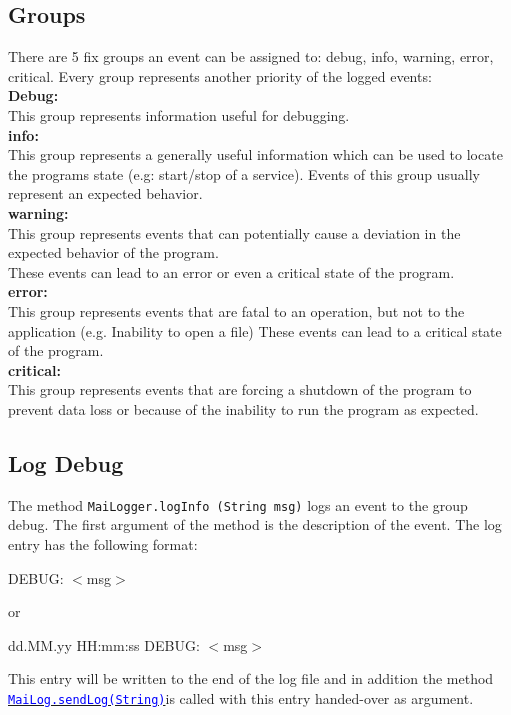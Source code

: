 \documentclass{article}
\newcommand{\refh}[2]{\hyperref[#1] {\textcolor{blue}{#2}}}
\newcommand{\sendLog}{\refh{setup_interface}{\lstinline|MaiLog.sendLog(String)|}}
\begin{document}
    \subsection{Groups}
    \label{logging_groups}
    There are 5 fix groups an event can be assigned to: debug, info, warning, error, critical.
    Every group represents another priority of the logged events: \\
    
    \textbf{Debug:} \\
    This group represents information useful for debugging. \\

    \textbf{info:} \\
    This group represents a generally useful information which can be used to locate the programs state (e.g: start/stop of a service).
    Events of this group usually represent an expected behavior. \\

    \textbf{warning:} \\
    This group represents events that can potentially cause a deviation in the expected behavior of the program. \\
    These events can lead to an error or even a critical state of the program. \\

    \textbf{error:} \\
    This group represents events that are fatal to an operation, but not to the application (e.g. Inability to open a file)
    These events can lead to a critical state of the program. \\

    \textbf{critical:} \\
    This group represents events that are forcing a shutdown of the program to prevent data loss or because of the inability to run the program as expected.

	\subsection{Log Debug}
	\label{logging_debug}
	The method \lstinline|MaiLogger.logInfo (String msg)| logs an event to the group debug.
	The first argument of the method is the description of the event.
	The log entry has the following format:
	\begin{description}
		\item DEBUG: $<$msg$>$
		\item or
		\item dd.MM.yy HH:mm:ss DEBUG: $<$msg$>$
	\end{description}
	This entry will be written to the end of the log file and in addition the method \sendLog is called with this entry handed-over as argument.
\end{document}
